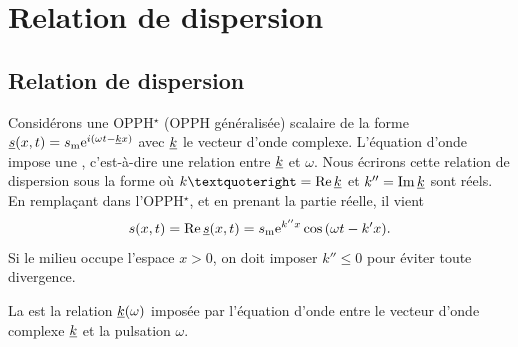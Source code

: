 \documentclass[12pt,fancy]{cours}%
\begin{document}

\ProgrammeColle


\section{Relation de dispersion}

\subsection{Relation de dispersion}
 Considérons une OPPH$^{\star}$ (OPPH généralisée) scalaire de la forme $\underline{s}(x,t)=s_{\rm{m}}\mathrm{e}^{i(\omega t-\underline{k}x)}$ avec $\underline{k}$ le vecteur d'onde complexe. L’équation d’onde impose une , c’est-à-dire une relation entre $\underline{k}$ et $\omega$. Nous écrirons cette relation de dispersion sous la forme
où $k’=\re\,\udl{k}$ et $k''={\rm Im}\,\underline{k}$ sont réels.
En remplaçant dans l'OPPH$^{\star}$, et en prenant la partie réelle, il vient
\begin{equation}
   s(x,t)={\rm Re} \, \underline{s}(x,t) = s_{\rm{m}}\mathrm{e}^{k''x}\cos{(\omega t-k' x)}.
\end{equation}
 Si le milieu occupe l’espace $x>0$, on doit imposer $k'' \leq 0$ pour éviter toute divergence.

 \begin{definition}\label{def:}
  La  est la relation $\underline{k}(\omega)$ imposée par l'équation d'onde entre le vecteur d'onde complexe $\underline{k}$ et la pulsation $\omega$.
  
 \end{definition}
\end{document}
